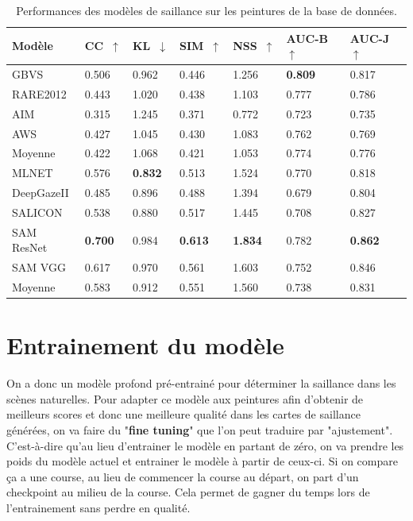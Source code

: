 \begin{table}[ht]
    \centering
        \begin{tabular}{|l|l|l|l|l|l|l|}
		\hline
        Modèle & CC~$\uparrow$ & KL~$\downarrow$ & SIM~$\uparrow$ & NSS~$\uparrow$ & AUC-B~$\uparrow$ & AUC-J~$\uparrow$\\
		\hline
        GBVS        & 0.506 & 0.962 & 0.446 & 1.256 & \textbf{0.809} & 0.817\\
        RARE2012    & 0.443 & 1.020 & 0.438 & 1.103 & 0.777 & 0.786\\
        AIM         & 0.315 & 1.245 & 0.371 & 0.772 & 0.723 & 0.735\\
        AWS         & 0.427 & 1.045 & 0.430 & 1.083 & 0.762 & 0.769\\
		\hline
        Moyenne     & 0.422 & 1.068 & 0.421 & 1.053 & 0.774 & 0.776\\
		\hline
        MLNET       & 0.576 & \textbf{0.832} & 0.513 & 1.524 & 0.770 & 0.818\\
        DeepGazeII  & 0.485 & 0.896 & 0.488 & 1.394 & 0.679 & 0.804\\
        SALICON     & 0.538 & 0.880 & 0.517 & 1.445 & 0.708 & 0.827\\
        SAM ResNet  & \textbf{0.700} & 0.984 & \textbf{0.613} & \textbf{1.834} & 0.782 & \textbf{0.862}\\
        SAM VGG     & 0.617 & 0.970 & 0.561 & 1.603 & 0.752 & 0.846\\
		\hline
        Moyenne     & 0.583 & 0.912 & 0.551 & 1.560 & 0.738 & 0.831\\
		\hline
        \end{tabular}
    \caption{Performances des modèles de saillance sur les peintures de la base de données.}
    \label{tab:scores}
\end{table}

\vfill

\newpage
\section{Entrainement du modèle}

\par
On a donc un modèle profond pré-entrainé pour déterminer la saillance dans les scènes naturelles. Pour adapter ce modèle aux peintures afin d'obtenir de meilleurs scores et donc une meilleure qualité dans les cartes de saillance générées, on va faire du "\textbf{fine tuning}" que l'on peut traduire par "ajustement". C'est-à-dire qu'au lieu d'entrainer le modèle en partant de zéro, on va prendre les poids du modèle actuel et entrainer le modèle à partir de ceux-ci. Si on compare ça a une course, au lieu de commencer la course au départ, on part d'un checkpoint au milieu de la course. Cela permet de gagner du temps lors de l'entrainement sans perdre en qualité.

